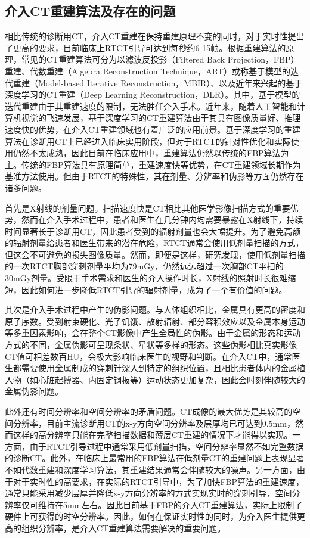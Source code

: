 \subsection{介入CT重建算法及存在的问题}
相比传统的诊断用CT，介入CT重建在保持重建原理不变的同时，对于实时性提出了更高的要求，目前临床上RTCT引导可达到每秒约6-15帧。根据重建算法的原理，常见的CT重建算法可分为以滤波反投影（Filtered Back Projection，FBP）重建、代数重建（Algebra Reconstruction Technique，ART）或称基于模型的迭代重建（Model-based Iterative Reconstruction，MBIR）、以及近年来兴起的基于深度学习的CT重建（Deep Learning Reconstruction，DLR）。其中，基于模型的迭代重建由于其重建速度的限制，无法胜任介入手术。近年来，随着人工智能和计算机视觉的飞速发展，基于深度学习的CT重建算法由于其具有图像质量好、推理速度快的优势，在介入CT重建领域也有着广泛的应用前景。基于深度学习的重建算法在诊断用CT上已经进入临床实用阶段，但对于RTCT的针对性优化和实际使用仍然不太成熟，因此目前在临床应用中，重建算法仍然以传统的FBP算法为主。传统的FBP算法具有原理简单，重建速度快等优势，在CT重建领域长期作为基准方法使用。但由于RTCT的特殊性，其在剂量、分辨率和伪影等方面仍然存在诸多问题。

首先是X射线的剂量问题。扫描速度快是CT相比其他医学影像扫描方式的重要优势，然而在介入手术过程中，患者和医生在几分钟内均需要暴露在X射线下，持续时间显著长于诊断用CT，因此患者受到的辐射剂量也会大幅提升。为了避免高额的辐射剂量给患者和医生带来的潜在危险，RTCT通常会使用低剂量扫描的方式，但这会不可避免的损失图像质量。然而，即便是这样，研究发现，使用低剂量扫描的一次RTCT胸部穿刺剂量平均为79mGy，仍然远远超过一次胸部CT平扫的30mGy剂量\cite{HuXiaoKunZhangFuJunXiaoYueYongCTJieRuZhiLiaoXue2020}。受限于手术需求和医生的介入操作时长，X射线的照射时长很难缩短，因此如何进一步降低RTCT引导的辐射剂量，成为了一个有价值的问题。

其次是介入手术过程中产生的伪影问题。与人体组织相比，金属具有更高的密度和原子序数。受到射束硬化、光子饥饿、散射辐射、部分容积效应以及金属本身运动等多重因素影响，会在整个CT影像中产生全局性的伪影\cite{demanMetalStreakArtifacts1999}。由于金属的形态和运动方式的不同，金属伪影可呈现条状、星状等多样的形态\cite{hsiehComputedTomographyPrinciples2022}。这些伪影相比真实影像CT值可相差数百HU，会极大影响临床医生的视野和判断。在介入CT中，通常医生都需要使用金属制成的穿刺针深入到特定的组织位置，且相比患者体内的金属植入物（如心脏起搏器、内固定钢板等）运动状态更加复杂，因此会时刻伴随较大的金属伪影问题。

此外还有时间分辨率和空间分辨率的矛盾问题。CT成像的最大优势是其较高的空间分辨率，目前主流诊断用CT的x-y方向空间分辨率及层厚均已可达到0.5mm，然而这样的高分辨率只能在完整扫描数据和薄层CT重建的情况下才能得以实现。一方面，由于RTCT引导过程中通常采用低剂量扫描，空间分辨率显然不如完整数据的诊断CT。此外，在临床上最常用的FBP算法在低剂量CT的重建问题上表现显著不如代数重建和深度学习算法，其重建结果通常会伴随较大的噪声。另一方面，由于对于实时性的高要求，在实际的RTCT引导中，为了加快FBP算法的重建速度，通常只能采用减少层厚并降低x-y方向分辨率的方式实现实时的穿刺引导，空间分辨率仅可维持在5mm左右。因此目前基于FBP的介入CT重建算法，实际上限制了硬件上可获得的时空分辨率。因此，如何在保证实时性的同时，为介入医生提供更高的组织分辨率，是介入CT重建算法需要解决的重要问题。

